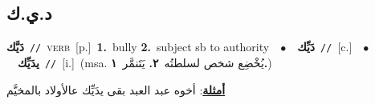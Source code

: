 \documentclass[10pt,a4paper,twoside]{article} %
\begin{document}
\begin{multicols}{2}
\vspace{-3mm}
\subsection*{\color{blue}\foreignlanguage{arabic}{د.ي.ك}\color{blue}{}} 

{\setlength\topsep{0pt}\textbf{\foreignlanguage{arabic}{دَيَّك}}\ {\color{gray}\texttt{//}\color{black}}\ \textsc{verb}\ [p.]\ \textbf{1.}~bully  \textbf{2.}~subject sb to authority\ \ $\bullet$\ \ \setlength\topsep{0pt}\textbf{\foreignlanguage{arabic}{دَيِّك}}\ {\color{gray}\texttt{//}\color{black}}\ [c.]\ \ $\bullet$\ \ \setlength\topsep{0pt}\textbf{\foreignlanguage{arabic}{يدَيِّك}}\ {\color{gray}\texttt{//}\color{black}}\ [i.]\ \color{gray}(msa. \foreignlanguage{arabic}{يُخْضِع شخص لسلطتُه}~\foreignlanguage{arabic}{\textbf{٢.}}  \foreignlanguage{arabic}{يَتَنمَّر}~\foreignlanguage{arabic}{\textbf{١.}})\color{black}\  \begin{flushright}\color{gray}\foreignlanguage{arabic}{\textbf{\underline{\foreignlanguage{arabic}{أمثلة}}}: أخوه عبد العبد بقى يدَيِّك عالأولاد بالمخيَّم}\end{flushright}\color{black}} \vspace{2mm}


\end{multicols}
\end{document}

